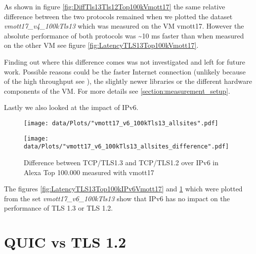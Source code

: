 As shown in figure \ref{fig:DiffTls13Tls12Top100kVmott17} the same relative difference between the two protocols remained when we plotted the dataset \textit{vmott17\_v4\_100kTls13} which was measured on the VM vmott17.
However the absolute performance of both protocols was \textasciitilde 10 ms faster than when measured on the other VM see figure \ref{fig:LatencyTLS13Top100kVmott17}.

Finding out where this difference comes was not investigated and left for future work.
Possible reasons could be the faster Internet connection (unlikely because of the high throughput see \cite{DBLP:conf/imc/SundaresanFTM13}), the slightly newer libraries or the different hardware components of the VM.
For more details see \ref{section:measurement_setup}.


Lastly we also looked at the impact of IPv6.

\begin{figure}[!thb]
	\centering
	\begin{minipage}{.45\textwidth}
		\centering
		\texttt{[image: data/Plots/"vmott17\_v6\_100kTls13\_allsites".pdf]}
		\caption{Latency of sites in Alexa Top 100.000 that support TLS 1.3 and IPv6 measured with vmott17 }
  		\label{fig:LatencyTLS13Top100kIPv6Vmott17}
  	\end{minipage}%
  	\hspace{0.5cm}
  	\begin{minipage}{.45\textwidth}
  		\centering
  		\texttt{[image: data/Plots/"vmott17\_v6\_100kTls13\_allsites\_difference".pdf]}
		\caption{Difference between TCP/TLS1.3 and TCP/TLS1.2 over IPv6 in Alexa Top 100.000 measured with vmott17}
  		\label{fig:DiffTls13Tls12Top100kIPv6Vmott17}
  	\end{minipage}
\end{figure}

The figures \ref{fig:LatencyTLS13Top100kIPv6Vmott17} and \ref{fig:DiffTls13Tls12Top100kIPv6Vmott17} which were plotted from the set \textit{vmott17\_v6\_100kTls13} show that IPv6 has no impact on the performance of TLS 1.3 or TLS 1.2.

\section{QUIC vs TLS 1.2}
\label{QUIC_vs_TLS_1.2}

